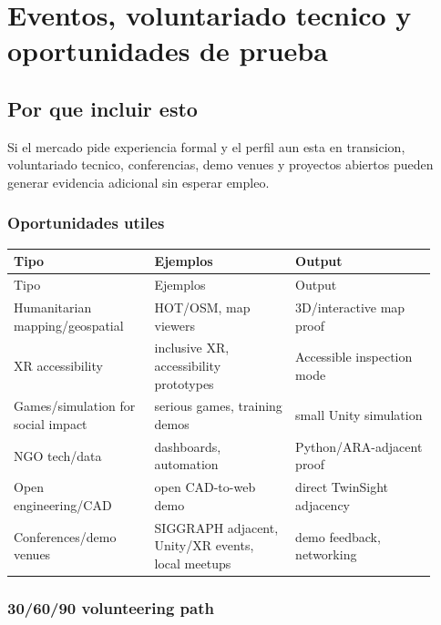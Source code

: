 \chapter{Eventos, voluntariado tecnico y oportunidades de prueba}

\section{Por que incluir esto}


Si el mercado pide experiencia formal y el perfil aun esta en transicion, voluntariado tecnico, conferencias, demo venues y proyectos abiertos pueden generar evidencia adicional sin esperar empleo.


\subsection{Oportunidades utiles}


\begin{center}
\scriptsize
\begin{longtable}{>{\raggedright\arraybackslash}p{0.305\linewidth} >{\raggedright\arraybackslash}p{0.305\linewidth} >{\raggedright\arraybackslash}p{0.305\linewidth}}
\toprule
Tipo & Ejemplos & Output \\
\midrule
\endfirsthead
\toprule
Tipo & Ejemplos & Output \\
\midrule
\endhead
Humanitarian mapping/geospatial & HOT/OSM, map viewers & 3D/interactive map proof \\
XR accessibility & inclusive XR, accessibility prototypes & Accessible inspection mode \\
Games/simulation for social impact & serious games, training demos & small Unity simulation \\
NGO tech/data & dashboards, automation & Python/ARA-adjacent proof \\
Open engineering/CAD & open CAD-to-web demo & direct TwinSight adjacency \\
Conferences/demo venues & SIGGRAPH adjacent, Unity/XR events, local meetups & demo feedback, networking \\
\bottomrule
\end{longtable}
\end{center}


\subsection{30/60/90 volunteering path}


